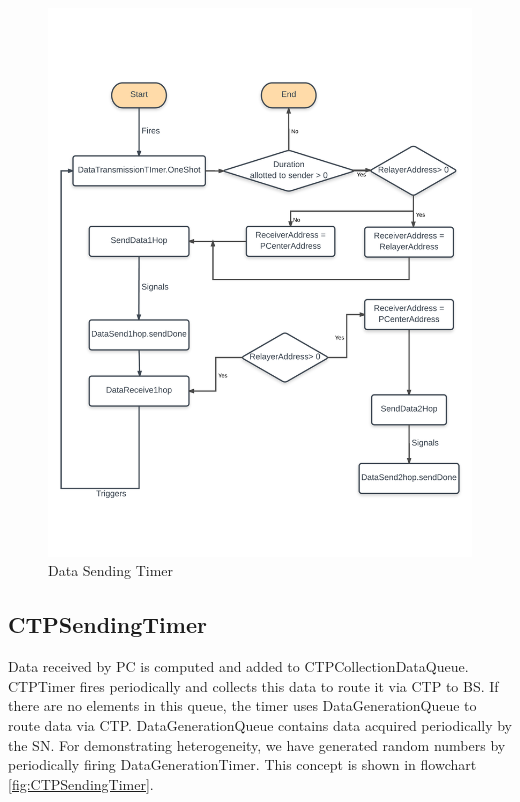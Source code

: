 	\begin{figure}
    \centering
    \includegraphics[width=1.0\textwidth]{gfx/DataSendingTimer.png}
    \caption{Data Sending Timer}
    \label{fig:DataSendingTimer}
    \end{figure}
    
        
	\subsection*{CTPSendingTimer}
	
	Data received by \ac{PC} is computed and added to CTPCollectionDataQueue. CTPTimer fires periodically and collects this data to route it via \ac{CTP} to \ac{BS}. If there are no elements in this queue, the timer uses DataGenerationQueue to route data via \ac{CTP}. DataGenerationQueue contains data acquired periodically by the \ac{SN}. For demonstrating heterogeneity, we have generated random numbers by periodically firing DataGenerationTimer. 
	This concept is shown in flowchart \ref{fig:CTPSendingTimer}.
    
